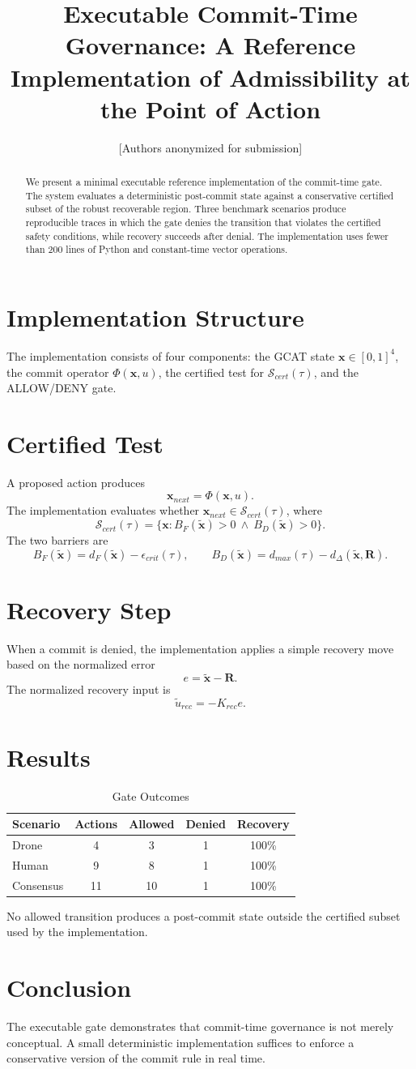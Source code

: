 \documentclass[letterpaper,10pt,conference]{ieeeconf}
\title{\bf Executable Commit-Time Governance: A Reference Implementation of Admissibility at the Point of Action}
\author{[Authors anonymized for submission]}
\newcommand{\x}{\mathbf{x}}
\newcommand{\xt}{\tilde{\mathbf{x}}}
\newcommand{\Scert}{\mathcal{S}_{cert}}
\newcommand{\Phiop}{\Phi}
\newcommand{\Rigel}{\mathbf{R}}
\begin{document}
\maketitle
\thispagestyle{empty}
\pagestyle{empty}
\begin{abstract}
We present a minimal executable reference implementation of the commit-time gate. The system evaluates a deterministic post-commit state against a conservative certified subset of the robust recoverable region. Three benchmark scenarios produce reproducible traces in which the gate denies the transition that violates the certified safety conditions, while recovery succeeds after denial. The implementation uses fewer than 200 lines of Python and constant-time vector operations.
\end{abstract}
\section{Implementation Structure}
The implementation consists of four components: the GCAT state $\x\in[0,1]^4$, the commit operator $\Phiop(\x,u)$, the certified test for $\Scert(\tau)$, and the ALLOW/DENY gate.
\section{Certified Test}
A proposed action produces
\[
\x_{next}=\Phiop(\x,u).
\]
The implementation evaluates whether $\x_{next}\in\Scert(\tau)$, where
\[
\Scert(\tau)=\{\x:B_F(\xt)>0\ \wedge\ B_D(\xt)>0\}.
\]
The two barriers are
\[
B_F(\xt)=d_F(\xt)-\epsilon_{crit}(\tau),\qquad
B_D(\xt)=d_{max}(\tau)-d_\Delta(\xt,\Rigel).
\]
\section{Recovery Step}
When a commit is denied, the implementation applies a simple recovery move based on the normalized error
\[
e=\xt-\Rigel.
\]
The normalized recovery input is
\[
\tilde u_{rec}=-K_{rec}e.
\]
\section{Results}
\begin{table}[h]
\centering
\caption{Gate Outcomes}
\begin{tabular}{lcccc}
\toprule
Scenario & Actions & Allowed & Denied & Recovery \\
\midrule
Drone & 4 & 3 & 1 & 100\% \\
Human & 9 & 8 & 1 & 100\% \\
Consensus & 11 & 10 & 1 & 100\% \\
\bottomrule
\end{tabular}
\end{table}
No allowed transition produces a post-commit state outside the certified subset used by the implementation.
\section{Conclusion}
The executable gate demonstrates that commit-time governance is not merely conceptual. A small deterministic implementation suffices to enforce a conservative version of the commit rule in real time.
\end{document}
